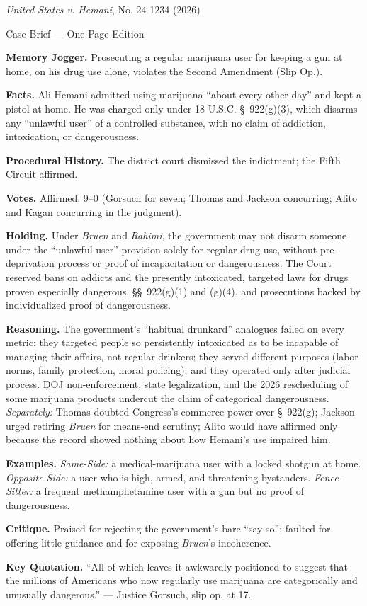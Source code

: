 \documentclass[12pt]{article}
\begin{document}
\begin{center}
{\Large \textit{United States v. Hemani}, No. 24-1234 (2026)\par}
\vspace{0.3em}
{\normalsize Case Brief --- One-Page Edition\par}
\end{center}

\textbf{Memory Jogger.} Prosecuting a regular marijuana user for keeping a gun at home, on his drug use alone, violates the Second Amendment (\href{https://www.supremecourt.gov/opinions/25pdf/24-1234_g2bh.pdf}{Slip Op.}).

\textbf{Facts.} Ali Hemani admitted using marijuana ``about every other day'' and kept a pistol at home. He was charged only under 18 U.S.C. \S~922(g)(3), which disarms any ``unlawful user'' of a controlled substance, with no claim of addiction, intoxication, or dangerousness.

\textbf{Procedural History.} The district court dismissed the indictment; the Fifth Circuit affirmed.

\textbf{Votes.} Affirmed, 9--0 (Gorsuch for seven; Thomas and Jackson concurring; Alito and Kagan concurring in the judgment).

\textbf{Holding.} Under \textit{Bruen} and \textit{Rahimi}, the government may not disarm someone under the ``unlawful user'' provision solely for regular drug use, without pre-deprivation process or proof of incapacitation or dangerousness. The Court reserved bans on addicts and the presently intoxicated, targeted laws for drugs proven especially dangerous, \S\S~922(g)(1) and (g)(4), and prosecutions backed by individualized proof of dangerousness.

\textbf{Reasoning.} The government's ``habitual drunkard'' analogues failed on every metric: they targeted people so persistently intoxicated as to be incapable of managing their affairs, not regular drinkers; they served different purposes (labor norms, family protection, moral policing); and they operated only after judicial process. DOJ non-enforcement, state legalization, and the 2026 rescheduling of some marijuana products undercut the claim of categorical dangerousness. \emph{Separately:} Thomas doubted Congress's commerce power over \S~922(g); Jackson urged retiring \textit{Bruen} for means-end scrutiny; Alito would have affirmed only because the record showed nothing about how Hemani's use impaired him.

\textbf{Examples.} \emph{Same-Side:} a medical-marijuana user with a locked shotgun at home. \emph{Opposite-Side:} a user who is high, armed, and threatening bystanders. \emph{Fence-Sitter:} a frequent methamphetamine user with a gun but no proof of dangerousness.

\textbf{Critique.} Praised for rejecting the government's bare ``say-so''; faulted for offering little guidance and for exposing \textit{Bruen}'s incoherence.

\textbf{Key Quotation.} ``All of which leaves it awkwardly positioned to suggest that the millions of Americans who now regularly use marijuana are categorically and unusually dangerous.'' --- Justice Gorsuch, slip op. at 17.
\end{document}
